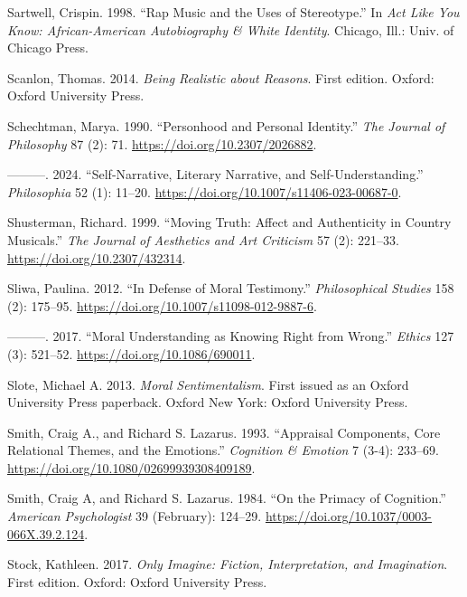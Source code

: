 \documentclass[12pt]{book}
\newenvironment{CSLReferences}%
  {\setlength{\parindent}{0pt}%
   \setlength{\leftskip}{0pt}%
   \setlength{\parskip}{0pt}}%
  {\par}
\theoremstyle{definition}
\theoremstyle{remark}
\begin{document}
\begin{CSLReferences}{1}{0}
Sartwell, Crispin. 1998. {``Rap {Music} and the {Uses} of {Stereotype}.''} In \emph{Act Like You Know: {African-American} Autobiography \& White Identity}. Chicago, Ill.: Univ. of Chicago Press.

Scanlon, Thomas. 2014. \emph{Being Realistic about Reasons}. First edition. Oxford: Oxford University Press.

Schechtman, Marya. 1990. {``Personhood and {Personal Identity}.''} \emph{The Journal of Philosophy} 87 (2): 71. \url{https://doi.org/10.2307/2026882}.

---------. 2024. {``Self-{Narrative}, {Literary Narrative}, and {Self-Understanding}.''} \emph{Philosophia} 52 (1): 11--20. \url{https://doi.org/10.1007/s11406-023-00687-0}.

Shusterman, Richard. 1999. {``Moving {Truth}: {Affect} and {Authenticity} in {Country Musicals}.''} \emph{The Journal of Aesthetics and Art Criticism} 57 (2): 221--33. \url{https://doi.org/10.2307/432314}.

Sliwa, Paulina. 2012. {``In Defense of Moral Testimony.''} \emph{Philosophical Studies} 158 (2): 175--95. \url{https://doi.org/10.1007/s11098-012-9887-6}.

---------. 2017. {``Moral {Understanding} as {Knowing Right} from {Wrong}.''} \emph{Ethics} 127 (3): 521--52. \url{https://doi.org/10.1086/690011}.

Slote, Michael A. 2013. \emph{Moral {Sentimentalism}}. First issued as an Oxford University Press paperback. Oxford New York: Oxford University Press.

Smith, Craig A., and Richard S. Lazarus. 1993. {``Appraisal {Components}, {Core Relational Themes}, and the {Emotions}.''} \emph{Cognition \& Emotion} 7 (3-4): 233--69. \url{https://doi.org/10.1080/02699939308409189}.

Smith, Craig A, and Richard S. Lazarus. 1984. {``On the {Primacy} of {Cognition}.''} \emph{American Psychologist} 39 (February): 124--29. \url{https://doi.org/10.1037/0003-066X.39.2.124}.

Stock, Kathleen. 2017. \emph{Only Imagine: Fiction, Interpretation, and Imagination}. First edition. Oxford: Oxford University Press.


\end{CSLReferences}
\end{document}
